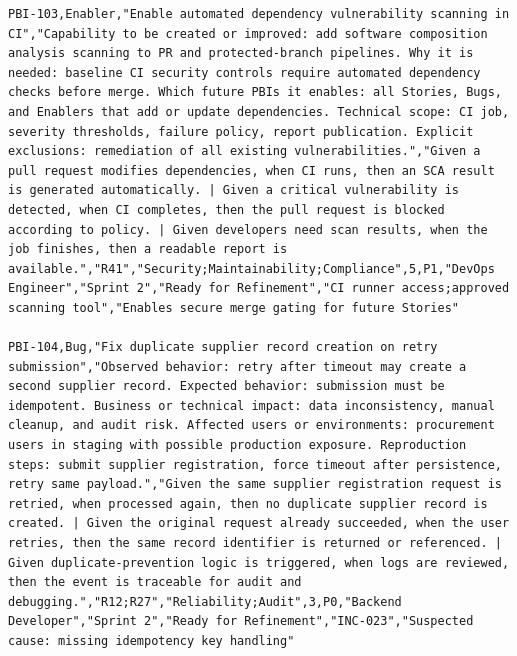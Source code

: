 \documentclass[11pt,a4paper]{article}
\begin{document}
\begin{tcolorbox}[title=Example Canonical Backlog CSV,colback=white,colframe=black]
\begin{lstlisting}[style=csvstyle]
PBI-103,Enabler,"Enable automated dependency vulnerability scanning in CI","Capability to be created or improved: add software composition analysis scanning to PR and protected-branch pipelines. Why it is needed: baseline CI security controls require automated dependency checks before merge. Which future PBIs it enables: all Stories, Bugs, and Enablers that add or update dependencies. Technical scope: CI job, severity thresholds, failure policy, report publication. Explicit exclusions: remediation of all existing vulnerabilities.","Given a pull request modifies dependencies, when CI runs, then an SCA result is generated automatically. | Given a critical vulnerability is detected, when CI completes, then the pull request is blocked according to policy. | Given developers need scan results, when the job finishes, then a readable report is available.","R41","Security;Maintainability;Compliance",5,P1,"DevOps Engineer","Sprint 2","Ready for Refinement","CI runner access;approved scanning tool","Enables secure merge gating for future Stories"

PBI-104,Bug,"Fix duplicate supplier record creation on retry submission","Observed behavior: retry after timeout may create a second supplier record. Expected behavior: submission must be idempotent. Business or technical impact: data inconsistency, manual cleanup, and audit risk. Affected users or environments: procurement users in staging with possible production exposure. Reproduction steps: submit supplier registration, force timeout after persistence, retry same payload.","Given the same supplier registration request is retried, when processed again, then no duplicate supplier record is created. | Given the original request already succeeded, when the user retries, then the same record identifier is returned or referenced. | Given duplicate-prevention logic is triggered, when logs are reviewed, then the event is traceable for audit and debugging.","R12;R27","Reliability;Audit",3,P0,"Backend Developer","Sprint 2","Ready for Refinement","INC-023","Suspected cause: missing idempotency key handling"


\end{lstlisting}
\end{tcolorbox}
\end{document}
